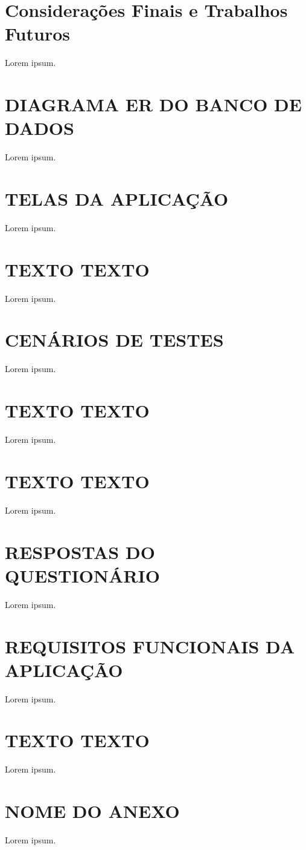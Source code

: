 \documentclass[english,brazilian]{UNISINOSartigo} %
\begin{document}
\section{Considerações Finais e Trabalhos Futuros}

Lorem ipsum.



\appendix
\section{DIAGRAMA ER DO BANCO DE DADOS}

Lorem ipsum.

\section{TELAS DA APLICAÇÃO}

Lorem ipsum.

\section{TEXTO TEXTO}

Lorem ipsum.

\section{CENÁRIOS DE TESTES}

Lorem ipsum.

\section{TEXTO TEXTO}

Lorem ipsum.

\section{TEXTO TEXTO}

Lorem ipsum.

\section{RESPOSTAS DO QUESTIONÁRIO}

Lorem ipsum.

\section{REQUISITOS FUNCIONAIS DA APLICAÇÃO}

Lorem ipsum.

\section{TEXTO TEXTO}

Lorem ipsum.

\annex
\section{NOME DO ANEXO}

Lorem ipsum.
\end{document}
